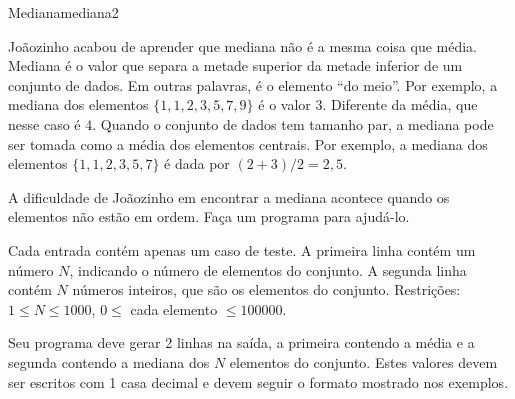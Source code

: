 \documentclass[12pt,a4paper,oneside]{article}
\begin{document}
\begin{problem}{Mediana}{mediana}{2}

Joãozinho acabou de aprender que mediana não é a mesma coisa que média. Mediana é o valor que separa a metade superior da metade inferior de um conjunto de dados. Em outras palavras, é o elemento ``do meio''. Por exemplo, a mediana dos elementos $\{1, 1, 2, 3, 5, 7, 9\}$ é o valor $3$. Diferente da média, que
nesse caso é $4$. Quando o conjunto de dados tem tamanho par, a mediana pode ser tomada como a média dos elementos centrais. Por exemplo, a mediana dos elementos $\{1, 1, 2, 3, 5, 7\}$ é dada por $(2+3)/2 = 2,5$.

A dificuldade de Joãozinho em encontrar a mediana acontece quando os elementos não estão em ordem. Faça um programa para ajudá-lo.

%

\InputFile

Cada entrada contém apenas um caso de teste. A primeira linha contém um número $N$, indicando o número de elementos do conjunto. A segunda linha contém $N$ números inteiros, que são os elementos do conjunto.  Restrições: $1 \leq N \leq 1000$, $0 \leq$ cada elemento $\leq 100000$.

\OutputFile

Seu programa deve gerar 2 linhas na saída, a primeira contendo a média e a segunda contendo a mediana dos $N$ elementos do conjunto. Estes valores devem ser escritos com 1 casa decimal e devem seguir o formato mostrado nos exemplos.


\Example

\begin{example}
%
\end{example}

\begin{example}
%
\end{example}

\begin{example}
%
\end{example}

\begin{example}
%
\end{example}


\end{problem}
\end{document}
